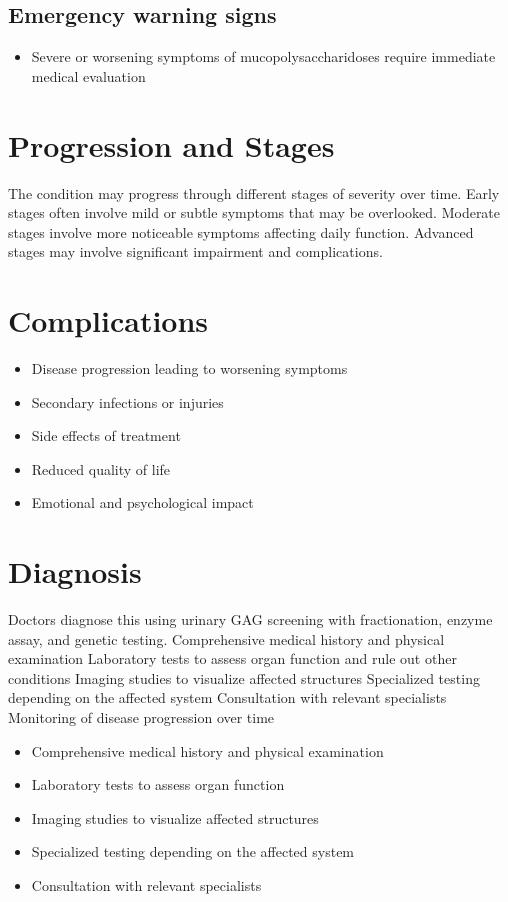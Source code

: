 \subsection{Emergency warning signs}
\begin{itemize}[noitemsep]
  \item Severe or worsening symptoms of mucopolysaccharidoses require immediate medical evaluation
\end{itemize}
\section{Progression and Stages}
The condition may progress through different stages of severity over time. Early stages often involve mild or subtle symptoms that may be overlooked. Moderate stages involve more noticeable symptoms affecting daily function. Advanced stages may involve significant impairment and complications.
\section{Complications}
\begin{itemize}[noitemsep]
  \item Disease progression leading to worsening symptoms
  \item Secondary infections or injuries
  \item Side effects of treatment
  \item Reduced quality of life
  \item Emotional and psychological impact
\end{itemize}
\section{Diagnosis}
Doctors diagnose this using urinary GAG screening with fractionation, enzyme assay, and genetic testing. Comprehensive medical history and physical examination Laboratory tests to assess organ function and rule out other conditions Imaging studies to visualize affected structures Specialized testing depending on the affected system Consultation with relevant specialists Monitoring of disease progression over time

\begin{itemize}[noitemsep]
  \item Comprehensive medical history and physical examination
  \item Laboratory tests to assess organ function
  \item Imaging studies to visualize affected structures
  \item Specialized testing depending on the affected system
  \item Consultation with relevant specialists
\end{itemize}
